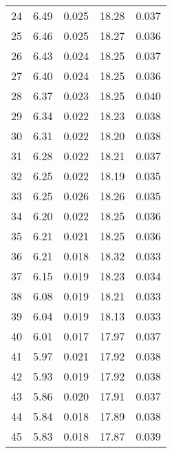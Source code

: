 \begin{table}
\begin{tabular}{c|ll|ll}
24 & 6.49 & 0.025 & 18.28 & 0.037 \\
25 & 6.46 & 0.025 & 18.27 & 0.036 \\
26 & 6.43 & 0.024 & 18.25 & 0.037 \\
27 & 6.40 & 0.024 & 18.25 & 0.036 \\
28 & 6.37 & 0.023 & 18.25 & 0.040 \\
29 & 6.34 & 0.022 & 18.23 & 0.038 \\
30 & 6.31 & 0.022 & 18.20 & 0.038 \\
31 & 6.28 & 0.022 & 18.21 & 0.037 \\
32 & 6.25 & 0.022 & 18.19 & 0.035 \\
33 & 6.25 & 0.026 & 18.26 & 0.035 \\
34 & 6.20 & 0.022 & 18.25 & 0.036 \\
35 & 6.21 & 0.021 & 18.25 & 0.036 \\
36 & 6.21 & 0.018 & 18.32 & 0.033 \\
37 & 6.15 & 0.019 & 18.23 & 0.034 \\
38 & 6.08 & 0.019 & 18.21 & 0.033 \\
39 & 6.04 & 0.019 & 18.13 & 0.033 \\
40 & 6.01 & 0.017 & 17.97 & 0.037 \\
41 & 5.97 & 0.021 & 17.92 & 0.038 \\
42 & 5.93 & 0.019 & 17.92 & 0.038 \\
43 & 5.86 & 0.020 & 17.91 & 0.037 \\
44 & 5.84 & 0.018 & 17.89 & 0.038 \\
45 & 5.83 & 0.018 & 17.87 & 0.039 \\
               \hline
        \end{tabular}
    \end{table}
    \clearpage

